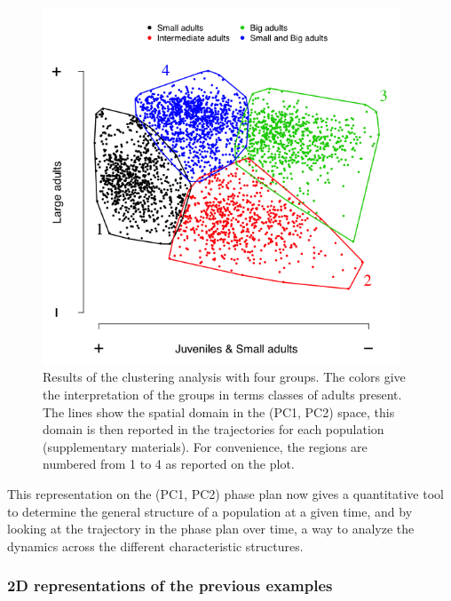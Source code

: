 \begin{figure}[!ht]
\begin{center}
\includegraphics[width=0.95\textwidth]{3-1_ChapExp1/Fig/AnnSP5}
\caption[Results of the clustering analysis
with four groups]{Results of the clustering analysis with four groups. The
colors give the interpretation of the groups in terms classes of adults present. The lines show the spatial domain in the (PC1, PC2) space, this domain is then reported in
the trajectories for each population (supplementary materials). For convenience,
the regions are numbered from 1 to 4 as reported on the plot.}
\label{fig:AnSP5}
\end{center}
\end{figure}

This representation on the (PC1, PC2) phase plan now gives a quantitative tool
to determine the general structure of a population at a given time, and by
looking at the trajectory in the phase plan over time, a way to analyze the
dynamics across the different characteristic structures.

\subsubsection{2D representations of the previous examples}

